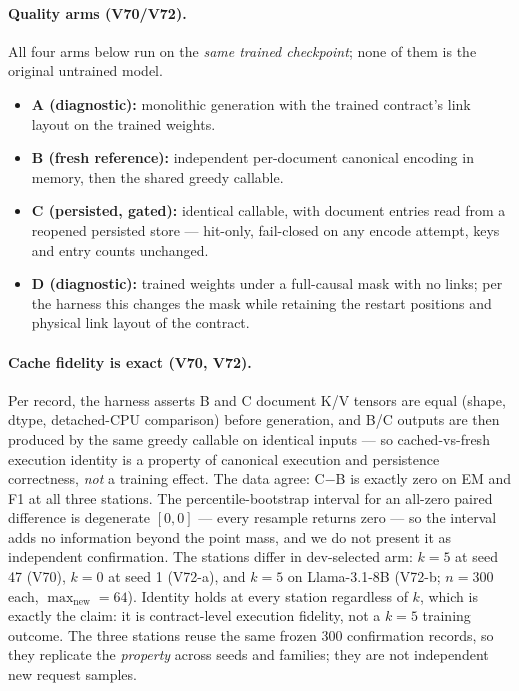 \paragraph{Quality arms (V70/V72).}
All four arms below run on the \emph{same trained checkpoint}; none of them
is the original untrained model.
\begin{itemize}
\item \textbf{A (diagnostic):} monolithic generation with the trained
contract's link layout on the trained weights.
\item \textbf{B (fresh reference):} independent per-document canonical
encoding in memory, then the shared greedy callable.
\item \textbf{C (persisted, gated):} identical callable, with document
entries read from a reopened persisted store --- hit-only, fail-closed on
any encode attempt, keys and entry counts unchanged.
\item \textbf{D (diagnostic):} trained weights under a full-causal mask with
no links; per the harness this changes the mask while retaining the restart
positions and physical link layout of the contract.
\end{itemize}

\paragraph{Cache fidelity is exact (V70, V72).}
Per record, the harness asserts B and C document K/V tensors are equal
(shape, dtype, detached-CPU comparison) before generation, and B/C outputs
are then produced by the same greedy callable on identical inputs --- so
cached-vs-fresh execution identity is a property of canonical execution and
persistence correctness, \emph{not} a training effect. The data agree: C$-$B
is exactly zero on EM and F1 at all three stations. The percentile-bootstrap
interval for an all-zero paired difference is degenerate $[0,0]$ --- every
resample returns zero --- so the interval adds no information beyond the
point mass, and we do not present it as independent confirmation. The
stations differ in dev-selected arm: $k{=}5$ at seed 47 (V70), $k{=}0$ at
seed 1 (V72-a), and $k{=}5$ on Llama-3.1-8B (V72-b; $n{=}300$ each,
$\max_{\text{new}}{=}64$). Identity holds at every station regardless of
$k$, which is exactly the claim: it is contract-level execution fidelity,
not a $k{=}5$ training outcome. The three stations reuse the same frozen
300 confirmation records, so they replicate the \emph{property} across
seeds and families; they are not independent new request samples.

